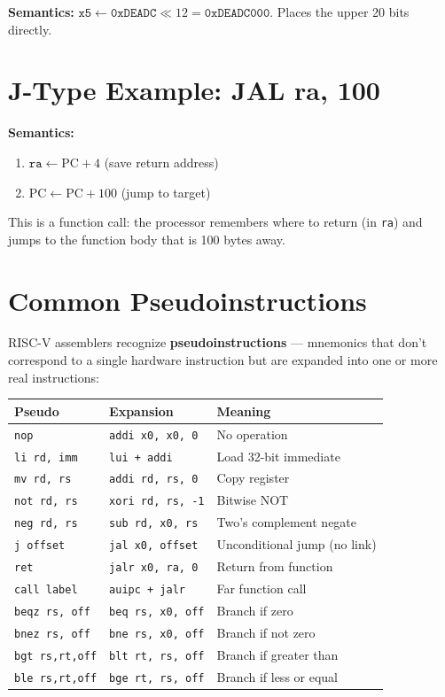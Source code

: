 \documentclass[12pt, a4paper, oneside]{book}
\begin{document}
\textbf{Semantics:} $\texttt{x5} \leftarrow \texttt{0xDEADC} \ll 12 = \texttt{0xDEADC000}$. Places the upper 20 bits directly.

\section{J-Type Example: JAL ra, 100}

\textbf{Semantics:}
\begin{enumerate}
  \item $\texttt{ra} \leftarrow \text{PC} + 4$ (save return address)
  \item $\text{PC} \leftarrow \text{PC} + 100$ (jump to target)
\end{enumerate}

This is a function call: the processor remembers where to return (in \texttt{ra}) and jumps to the function body that is 100 bytes away.

\section{Common Pseudoinstructions}

RISC-V assemblers recognize \textbf{pseudoinstructions} --- mnemonics that don't correspond to a single hardware instruction but are expanded into one or more real instructions:

\begin{center}
\renewcommand{\arraystretch}{1.25}
\begin{tabular}{l l p{5.5cm}}
\toprule
\textbf{\color{purple}Pseudo} & \textbf{\color{purple}Expansion} & \textbf{\color{purple}Meaning} \\
\midrule
\texttt{nop}          & \texttt{addi x0, x0, 0}    & No operation \\
\texttt{li rd, imm}   & \texttt{lui + addi}         & Load 32-bit immediate \\
\texttt{mv rd, rs}    & \texttt{addi rd, rs, 0}     & Copy register \\
\texttt{not rd, rs}   & \texttt{xori rd, rs, -1}    & Bitwise NOT \\
\texttt{neg rd, rs}   & \texttt{sub rd, x0, rs}     & Two's complement negate \\
\texttt{j offset}     & \texttt{jal x0, offset}     & Unconditional jump (no link) \\
\texttt{ret}          & \texttt{jalr x0, ra, 0}     & Return from function \\
\texttt{call label}   & \texttt{auipc + jalr}       & Far function call \\
\texttt{beqz rs, off} & \texttt{beq rs, x0, off}    & Branch if zero \\
\texttt{bnez rs, off} & \texttt{bne rs, x0, off}    & Branch if not zero \\
\texttt{bgt rs,rt,off}& \texttt{blt rt, rs, off}    & Branch if greater than \\
\texttt{ble rs,rt,off}& \texttt{bge rt, rs, off}    & Branch if less or equal \\
\bottomrule
\end{tabular}
\end{center}
\end{document}

